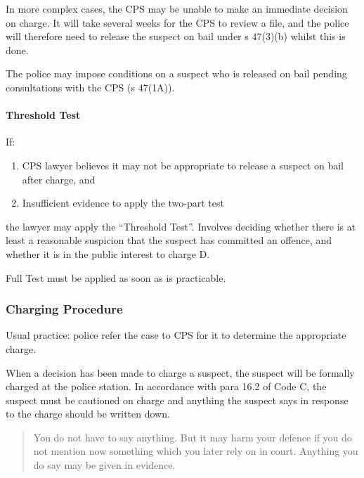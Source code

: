 \documentclass[
]{article}
\providecommand{\tightlist}{%
  \setlength{\itemsep}{0pt}\setlength{\parskip}{0pt}}
\begin{document}
In more complex cases, the CPS may be unable to make an immediate
decision on charge. It will take several weeks for the CPS to review a
file, and the police will therefore need to release the suspect on bail
under s 47(3)(b) whilst this is done.

The police may impose conditions on a suspect who is released on bail
pending consultations with the CPS (s 47(1A)).

\hypertarget{threshold-test}{%
\paragraph{Threshold Test}\label{threshold-test}}

If:

\begin{enumerate}
\def\labelenumi{\arabic{enumi}.}
\tightlist
\item
  CPS lawyer believes it may not be appropriate to release a suspect on
  bail after charge, and
\item
  Insufficient evidence to apply the two-part test
\end{enumerate}

the lawyer may apply the ``Threshold Test''. Involves deciding whether
there is at least a reasonable suspicion that the suspect has committed
an offence, and whether it is in the public interest to charge D.

Full Test must be applied as soon as is practicable.

\hypertarget{charging-procedure}{%
\subsubsection{Charging Procedure}\label{charging-procedure}}

Usual practice: police refer the case to CPS for it to determine the
appropriate charge.

When a decision has been made to charge a suspect, the suspect will be
formally charged at the police station. In accordance with para 16.2 of
Code C, the suspect must be cautioned on charge and anything the suspect
says in response to the charge should be written down.

\begin{quote}
You do not have to say anything. But it may harm your defence if you do
not mention now something which you later rely on in court. Anything you
do say may be given in evidence.
\end{quote}
\end{document}
